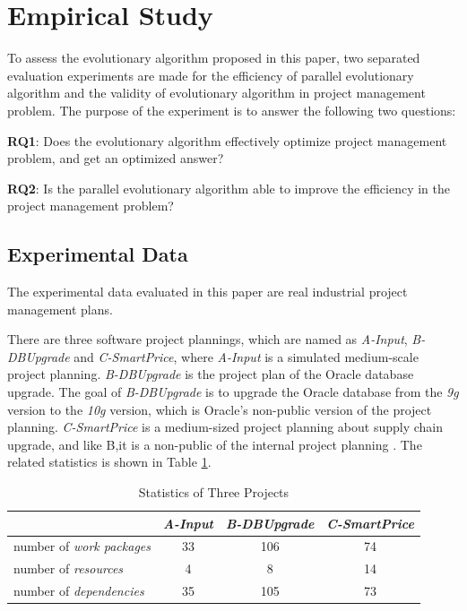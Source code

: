 %
%

\section{Empirical Study}
%
To assess the evolutionary algorithm proposed in this paper, two separated
evaluation experiments are made for the efficiency of parallel evolutionary
algorithm and the validity of evolutionary algorithm in project management
problem. The purpose of the experiment is to answer the following two questions:


\textbf{RQ1}: Does the evolutionary algorithm effectively optimize project
management problem, and get an optimized answer?

\textbf{RQ2}: Is the parallel evolutionary algorithm able to improve the
efficiency in the project management problem?


\subsection{Experimental Data}
%
The experimental data evaluated in this paper are real industrial project
management plans.


There are three software project plannings, which are named
as \emph{A-Input}, \emph{B-DBUpgrade} and \emph{C-SmartPrice}, where
\emph{A-Input} is a simulated medium-scale project planning. \emph{B-DBUpgrade}
is the project plan of the Oracle database upgrade. The goal of
\emph{B-DBUpgrade} is to upgrade the Oracle database from the \emph{9g} version
to the \emph{10g} version, which is Oracle's non-public version of the project
planning. \emph{C-SmartPrice} is a medium-sized project planning about supply
chain upgrade, and like B,it is a non-public of the internal project planning
\cite{ren}. The related statistics is shown in Table \ref{table:statis}.

\begin{table}
  \caption{Statistics of Three Projects}
  \label{table:statis}
  \begin{center}
  \begin{tabular}{lccc}
    \hline
      & \emph{ A-Input } & \emph{ B-DBUpgrade } & \emph{ C-SmartPrice } \\
    \hline
    number of \emph{work packages} & 33 & 106 & 74 \\
    number of \emph{resources}     & 4  & 8   & 14 \\
    number of \emph{dependencies}  & 35 & 105 & 73 \\
    \hline
  \end{tabular}
  \end{center}
\end{table}



